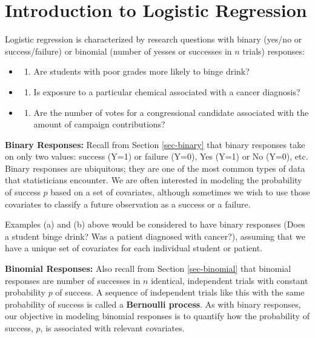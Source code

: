\documentclass[
]{krantz}
\providecommand{\tightlist}{%
  \setlength{\itemsep}{0pt}\setlength{\parskip}{0pt}}
\begin{document}
\hypertarget{introduction-to-logistic-regression}{%
\section{Introduction to Logistic Regression}\label{introduction-to-logistic-regression}}

Logistic regression is characterized by research questions with binary (yes/no or success/failure) or binomial (number of yesses or successes in \(n\) trials) responses:

\begin{itemize}
\item
  \begin{enumerate}
  \def\labelenumi{\alph{enumi}.}
  \tightlist
  \item
    Are students with poor grades more likely to binge drink?
  \end{enumerate}
\item
  \begin{enumerate}
  \def\labelenumi{\alph{enumi}.}
  \setcounter{enumi}{1}
  \tightlist
  \item
    Is exposure to a particular chemical associated with a cancer diagnosis?
  \end{enumerate}
\item
  \begin{enumerate}
  \def\labelenumi{\alph{enumi}.}
  \setcounter{enumi}{2}
  \tightlist
  \item
    Are the number of votes for a congressional candidate associated with the amount of campaign contributions?
  \end{enumerate}
\end{itemize}

\textbf{Binary Responses:} Recall from Section \ref{sec-binary} that binary responses take on only two values: success (Y=1) or failure (Y=0), Yes (Y=1) or No (Y=0), etc. Binary responses are ubiquitous; they are one of the most common types of data that statisticians encounter. We are often interested in modeling the probability of success \(p\) based on a set of covariates, although sometimes we wish to use those covariates to classify a future observation as a success or a failure.

Examples (a) and (b) above would be considered to have binary responses (Does a student binge drink? Was a patient diagnosed with cancer?), assuming that we have a unique set of covariates for each individual student or patient.

\textbf{Binomial Responses:} Also recall from Section \ref{sec-binomial} that binomial responses are number of successes in \(n\) identical, independent trials with constant probability \(p\) of success. A sequence of independent trials like this with the same probability of success is called a \textbf{Bernoulli process}. As with binary responses, our objective in modeling binomial responses is to quantify how the probability of success, \(p\), is associated with relevant covariates.
\end{document}
